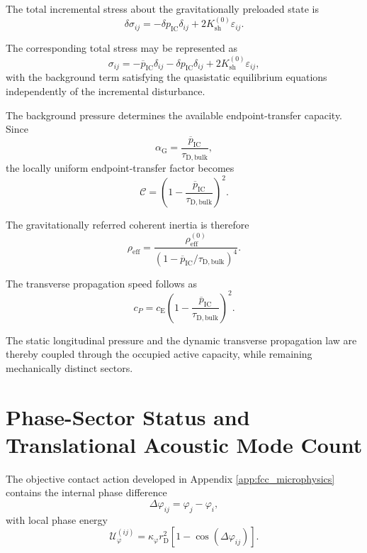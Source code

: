 The total incremental stress about the gravitationally preloaded state is
\begin{equation}
    \delta\sigma_{ij} = -\delta p_{\mathrm{IC}}\delta_{ij} + 2K_{\mathrm{sh}}^{(0)} \varepsilon_{ij}.
\end{equation}

The corresponding total stress may be represented as
\begin{equation}
    \sigma_{ij} = -\overline{p}_{\mathrm{IC}}\delta_{ij} - \delta p_{\mathrm{IC}}\delta_{ij} + 2K_{\mathrm{sh}}^{(0)} \varepsilon_{ij},
\end{equation}
with the background term satisfying the quasistatic equilibrium equations independently of the incremental disturbance.

The background pressure determines the available endpoint-transfer capacity. Since
\begin{equation}
    \alpha_{\mathrm{G}} = \frac{\overline{p}_{\mathrm{IC}}}{\tau_{\mathrm{D,bulk}}},
\end{equation}
the locally uniform endpoint-transfer factor becomes
\begin{equation}
    \mathcal{C} = \left( 1- \frac{\overline{p}_{\mathrm{IC}}}{\tau_{\mathrm{D,bulk}}} \right)^2.
\end{equation}

The gravitationally referred coherent inertia is therefore
\begin{equation}
    \rho_{\mathrm{eff}} = \frac{\rho_{\mathrm{eff}}^{(0)}}{ \left( 1- \overline{p}_{\mathrm{IC}} / \tau_{\mathrm{D,bulk}} \right)^4 }.
\end{equation}

The transverse propagation speed follows as
\begin{equation}
    \boxed{ c_P = c_{\mathrm{E}} \left( 1- \frac{\overline{p}_{\mathrm{IC}}}{\tau_{\mathrm{D,bulk}}} \right)^2 }.
\end{equation}

The static longitudinal pressure and the dynamic transverse propagation law are thereby coupled through the occupied active capacity, while remaining mechanically distinct sectors.

\section{Phase-Sector Status and Translational Acoustic Mode Count}

The objective contact action developed in Appendix \ref{app:fcc_microphysics} contains the internal phase difference
\begin{equation}
    \Delta\varphi_{ij} = \varphi_j-\varphi_i,
\end{equation}
with local phase energy
\begin{equation}
    \mathcal{U}_{\varphi}^{(ij)} = \kappa_\varphi r_{\mathrm{D}}^2 \left[ 1-\cos(\Delta\varphi_{ij}) \right].
\end{equation}

